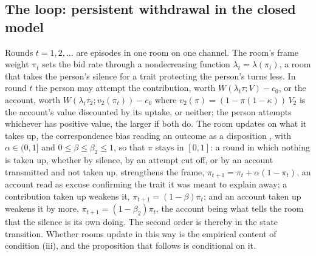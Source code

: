 
\subsection{The loop: persistent withdrawal in the closed model}\label{sec:loop}

Rounds $t = 1, 2, \ldots$ are episodes in one room on one channel. The room's frame weight $\pi_t$ sets the bid rate through a nondecreasing function $\lambda_t = \lambda(\pi_t)$, a room that takes the person's silence for a trait protecting the person's turns less. In round $t$ the person may attempt the contribution, worth $W(\lambda_t\tau; V) - c_0$, or the account, worth $W(\lambda_t\tau_2; v_2(\pi_t)) - c_0$ where $v_2(\pi) = (1 - \pi(1-\kappa))\,V_2$ is the account's value discounted by its uptake, or neither; the person attempts whichever has positive value, the larger if both do. The room updates on what it takes up, the correspondence bias reading an outcome as a disposition \cite{Gilbert1995}, with $\alpha \in (0,1]$ and $0 \le \beta \le \beta_2 \le 1$, so that $\pi$ stays in $[0,1]$: a round in which nothing is taken up, whether by silence, by an attempt cut off, or by an account transmitted and not taken up, strengthens the frame, $\pi_{t+1} = \pi_t + \alpha(1-\pi_t)$, an account read as excuse confirming the trait it was meant to explain away; a contribution taken up weakens it, $\pi_{t+1} = (1-\beta)\pi_t$; and an account taken up weakens it by more, $\pi_{t+1} = (1-\beta_2)\pi_t$, the account being what tells the room that the silence is its own doing. The second order is thereby in the state transition. Whether rooms update in this way is the empirical content of condition (iii), and the proposition that follows is conditional on it.

